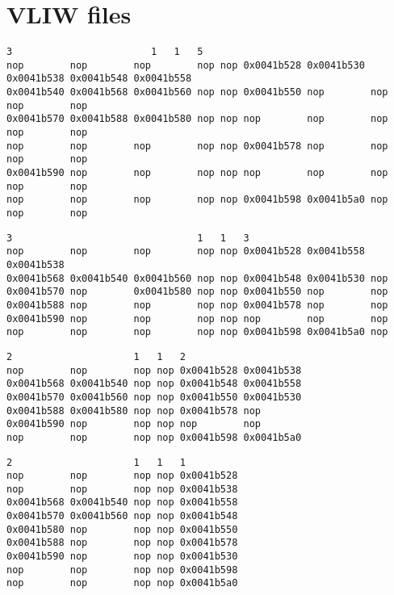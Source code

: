 \documentclass[titlepage, a4paper]{article}
\begin{document}
\section{VLIW files}
\begin{lstlisting}[caption=VLIW 1, basicstyle=\tiny]
3          		         1   1   5
nop        nop        nop        nop nop 0x0041b528 0x0041b530 0x0041b538 0x0041b548 0x0041b558
0x0041b540 0x0041b568 0x0041b560 nop nop 0x0041b550 nop        nop        nop        nop
0x0041b570 0x0041b588 0x0041b580 nop nop nop        nop        nop        nop        nop
nop        nop        nop        nop nop 0x0041b578 nop        nop        nop        nop
0x0041b590 nop        nop        nop nop nop        nop        nop        nop        nop
nop        nop        nop        nop nop 0x0041b598 0x0041b5a0 nop        nop        nop
\end{lstlisting}

\begin{lstlisting}[caption=VLIW 2, basicstyle=\tiny]
3                                1   1   3
nop        nop        nop        nop nop 0x0041b528 0x0041b558 0x0041b538
0x0041b568 0x0041b540 0x0041b560 nop nop 0x0041b548 0x0041b530 nop
0x0041b570 nop        0x0041b580 nop nop 0x0041b550 nop        nop
0x0041b588 nop        nop        nop nop 0x0041b578 nop        nop
0x0041b590 nop        nop        nop nop nop        nop        nop
nop        nop        nop        nop nop 0x0041b598 0x0041b5a0 nop
\end{lstlisting}

\begin{lstlisting}[caption=VLIW 3, basicstyle=\tiny]
2                     1   1   2
nop        nop        nop nop 0x0041b528 0x0041b538
0x0041b568 0x0041b540 nop nop 0x0041b548 0x0041b558
0x0041b570 0x0041b560 nop nop 0x0041b550 0x0041b530
0x0041b588 0x0041b580 nop nop 0x0041b578 nop
0x0041b590 nop        nop nop nop        nop		
nop        nop        nop nop 0x0041b598 0x0041b5a0	
\end{lstlisting}

\begin{lstlisting}[caption=VLIW 4, basicstyle=\tiny]
2                     1   1   1
nop        nop        nop nop 0x0041b528	
nop        nop        nop nop 0x0041b538	
0x0041b568 0x0041b540 nop nop 0x0041b558	
0x0041b570 0x0041b560 nop nop 0x0041b548	
0x0041b580 nop        nop nop 0x0041b550
0x0041b588 nop        nop nop 0x0041b578	
0x0041b590 nop        nop nop 0x0041b530		
nop        nop        nop nop 0x0041b598	
nop        nop        nop nop 0x0041b5a0
\end{lstlisting}
\end{document}
